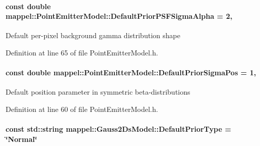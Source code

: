 \paragraph[{\texorpdfstring{Default\+Prior\+P\+S\+F\+Sigma\+Alpha}{DefaultPriorPSFSigmaAlpha}}]{\setlength{\rightskip}{0pt plus 5cm}const double mappel\+::\+Point\+Emitter\+Model\+::\+Default\+Prior\+P\+S\+F\+Sigma\+Alpha = 2\hspace{0.3cm}{\ttfamily [static]}, {\ttfamily [inherited]}}\hypertarget{classmappel_1_1PointEmitterModel_a2b06111eaa1ff284851c2e67a3827220}{}\label{classmappel_1_1PointEmitterModel_a2b06111eaa1ff284851c2e67a3827220}
Default per-\/pixel background gamma distribution shape 

Definition at line 65 of file Point\+Emitter\+Model.\+h.

\paragraph[{\texorpdfstring{Default\+Prior\+Sigma\+Pos}{DefaultPriorSigmaPos}}]{\setlength{\rightskip}{0pt plus 5cm}const double mappel\+::\+Point\+Emitter\+Model\+::\+Default\+Prior\+Sigma\+Pos = 1\hspace{0.3cm}{\ttfamily [static]}, {\ttfamily [inherited]}}\hypertarget{classmappel_1_1PointEmitterModel_a38b73a91eaae7b5fd0977b88ea844280}{}\label{classmappel_1_1PointEmitterModel_a38b73a91eaae7b5fd0977b88ea844280}
Default position parameter in symmetric beta-\/distributions 

Definition at line 60 of file Point\+Emitter\+Model.\+h.

\paragraph[{\texorpdfstring{Default\+Prior\+Type}{DefaultPriorType}}]{\setlength{\rightskip}{0pt plus 5cm}const std\+::string mappel\+::\+Gauss2\+Ds\+Model\+::\+Default\+Prior\+Type = \char`\"{}Normal\char`\"{}\hspace{0.3cm}{\ttfamily [static]}}\hypertarget{classmappel_1_1Gauss2DsModel_ac00cce582449c74c64f624ec85c9e164}{}\label{classmappel_1_1Gauss2DsModel_ac00cce582449c74c64f624ec85c9e164}


